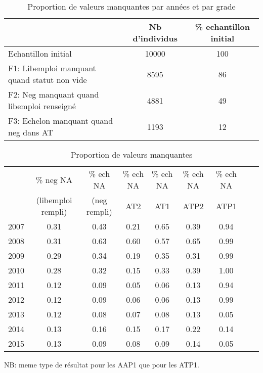 \documentclass[11pt,a4paper]{article}
\begin{document}
\begin{table}[h!]
\centering
\caption{Proportion de valeurs manquantes par années et par grade} 
\label{filters}
\begin{tabular}{lcc}
\toprule
 & Nb d'individus & \% echantillon initial \\ 
  \hline
Echantillon initial & 10000 & 100 \\ 
F1: Libemploi manquant quand statut non vide & 8595 & 86 \\ 
F2: Neg manquant quand libemploi renseigné & 4881 & 49 \\ 
F3: Echelon manquant quand neg dans AT & 1193 & 12 \\ 
\bottomrule
\end{tabular}
\end{table}

\begin{table}[h!]
\centering
\caption{Proportion de valeurs manquantes} 
\label{filters}
\begin{tabular}{lcccccccc}
\toprule
& \% neg NA  & \% ech NA & \% ech NA   & \% ech NA   & \% ech NA  & \% ech NA  \\ 
& (libemploi rempli) & (neg rempli) & AT2 & AT1 & ATP2 & ATP1 \\
  \midrule 
2007 & 0.31 & 0.43 & 0.21 & 0.65 & 0.39 & 0.94 \\ 
  2008 & 0.31 & 0.63 & 0.60 & 0.57 & 0.65 & 0.99 \\ 
  2009 & 0.29 & 0.34 & 0.19 & 0.35 & 0.31 & 0.99 \\ 
  2010 & 0.28 & 0.32 & 0.15 & 0.33 & 0.39 & 1.00 \\ 
  2011 & 0.12 & 0.09 & 0.05 & 0.06 & 0.13 & 0.94 \\ 
  2012 & 0.12 & 0.09 & 0.06 & 0.06 & 0.13 & 0.99 \\ 
  2013 & 0.12 & 0.08 & 0.07 & 0.08 & 0.13 & 0.05 \\ 
  2014 & 0.13 & 0.16 & 0.15 & 0.17 & 0.22 & 0.14 \\ 
  2015 & 0.13 & 0.09 & 0.08 & 0.09 & 0.14 & 0.05 \\ 
\bottomrule
\end{tabular}
\end{table}

NB: meme type de résultat pour les AAP1 que pour les ATP1.
\end{document}
